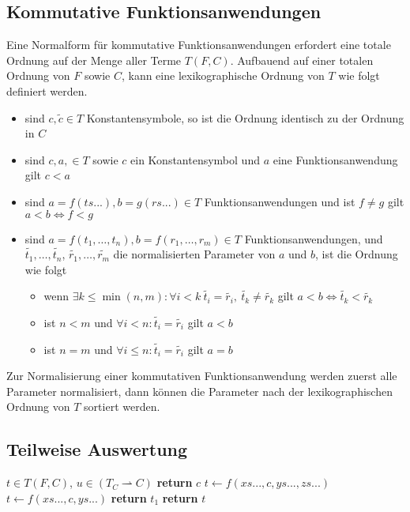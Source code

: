 \documentclass{scrartcl}
\numberwithin{figure}{section} %
\theoremstyle{definition} %
\begin{document}
\subsection{Kommutative Funktionsanwendungen}
Eine Normalform für kommutative Funktionsanwendungen erfordert eine totale Ordnung auf der Menge aller Terme $T(F, C)$. Aufbauend auf einer totalen Ordnung von $F$ sowie $C$, kann eine lexikographische Ordnung von $T$ wie folgt definiert werden. 
\begin{itemize}
	\item{sind $c, \tilde{c} \in T$ Konstantensymbole, so ist die Ordnung identisch zu der Ordnung in $C$}
	\item{sind $c, a, \in T$ sowie $c$ ein Konstantensymbol und $a$ eine Funktionsanwendung gilt $c < a$ }
	\item{sind $a = f(ts...), b = g(rs...) \in T$ Funktionsanwendungen und ist $f \neq g$ gilt $a < b \iff f < g $}
	\item{sind $a = f(t_1, \dots, t_n), b = f(r_1, \dots, r_m) \in T$ Funktionsanwendungen, und $\tilde{t_1}, \dots, \tilde{t_n}$, $\tilde{r_1}, \dots, \tilde{r_m}$ die normalisierten Parameter von $a$ und $b$, ist die Ordnung wie folgt}
	\begin{itemize}
		\item{wenn $\exists k \leq \min{(n, m)} \colon \forall i < k ~ \tilde{t_i} = \tilde{r_i} ,~ \tilde{t_k} \neq \tilde{r_k} $ gilt ${a < b \iff \tilde{t_k} < \tilde{r_k}}$}
		\item{ist $n < m$ und $\forall i < n\colon \tilde{t_i} = \tilde{r_i}$ gilt $a < b$}
		\item{ist $n = m$ und $\forall i \leq n\colon \tilde{t_i} = \tilde{r_i}$ gilt $a = b$}
	\end{itemize}
\end{itemize}
Zur Normalisierung einer kommutativen Funktionsanwendung werden zuerst alle Parameter normalisiert, dann können die Parameter nach der lexikographischen Ordnung von $T$ sortiert werden.

\subsection{Teilweise Auswertung}
\begin{algorithm}
\caption{$\mathrm{combine} \colon T \times (T_C \rightharpoonup C) \rightarrow T$}\label{combine}
\begin{algorithmic}[1] %
\Require $t \in T(F, C)$, $u \in (T_C \rightharpoonup C)$
	\State \textbf{return} $c$ 
			\State $t \leftarrow f(xs..., c, ys..., zs...)$
		\EndWhile
	\Else
			\State $t \leftarrow f(xs..., c, ys...)$
		\EndWhile
	\EndIf
		\State \textbf{return} $t_1$ 
	\EndIf
\EndIf
\State \textbf{return} $t$ 
\end{algorithmic}
\end{algorithm}
\end{document}
